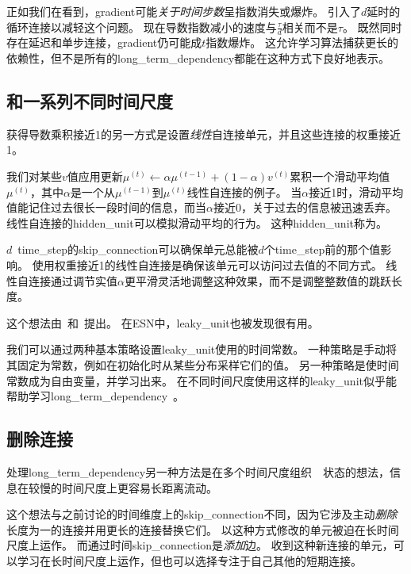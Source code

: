 正如我们在看到，\gls{gradient}可能\emph{关于时间步数}呈指数消失或爆炸。
\citep{Lin-ieeetnn96}引入了$d$延时的循环连接以减轻这个问题。
现在导数指数减小的速度与$\frac{\tau}{d}$相关而不是$\tau$。
既然同时存在延迟和单步连接，\gls{gradient}仍可能成$t$指数爆炸。
这允许学习算法捕获更长的依赖性，但不是所有的\gls{long_term_dependency}都能在这种方式下良好地表示。


\subsection{和一系列不同时间尺度}
\label{sec:leaky_units_and_a_spectrum_of_different_time_scales}
获得导数乘积接近1的另一方式是设置\emph{线性}自连接单元，并且这些连接的权重接近1。

我们对某些$v$值应用更新$\mu^{(t)} \gets \alpha \mu^{(t-1)} + (1-\alpha) v^{(t)}$累积一个滑动平均值$\mu^{(t)}$，其中$\alpha$是一个从$ \mu^{(t-1)}$到$ \mu^{(t)}$线性自连接的例子。
当$\alpha$接近1时，滑动平均值能记住过去很长一段时间的信息，而当$\alpha$接近0，关于过去的信息被迅速丢弃。
线性自连接的\gls{hidden_unit}可以模拟滑动平均的行为。
这种\gls{hidden_unit}称为。

$d$~\gls{time_step}的\gls{skip_connection}可以确保单元总能被$d$个\gls{time_step}前的那个值影响。
使用权重接近1的线性自连接是确保该单元可以访问过去值的不同方式。
线性自连接通过调节实值$\alpha$更平滑灵活地调整这种效果，而不是调整整数值的跳跃长度。

这个想法由~\cite{Mozer-nips92}和~\cite{ElHihi+Bengio-nips8}提出。
在\gls{ESN}中，\gls{leaky_unit}也被发现很有用\citep{JaegerLPS07}。

我们可以通过两种基本策略设置\gls{leaky_unit}使用的时间常数。
一种策略是手动将其固定为常数，例如在初始化时从某些分布采样它们的值。
另一种策略是使时间常数成为自由变量，并学习出来。
在不同时间尺度使用这样的\gls{leaky_unit}似乎能帮助学习\gls{long_term_dependency}~\citep{Mozer-nips92,Pascanu+al-ICML2013-small}。

\subsection{删除连接}
\label{sec:removing_connections}
处理\gls{long_term_dependency}另一种方法是在多个时间尺度组织~~状态的想法\citep{ElHihi+Bengio-nips8}，信息在较慢的时间尺度上更容易长距离流动。

这个想法与之前讨论的时间维度上的\gls{skip_connection}不同，因为它涉及主动\emph{删除}长度为一的连接并用更长的连接替换它们。
以这种方式修改的单元被迫在长时间尺度上运作。
而通过时间\gls{skip_connection}是\emph{添加}边。
收到这种新连接的单元，可以学习在长时间尺度上运作，但也可以选择专注于自己其他的短期连接。

